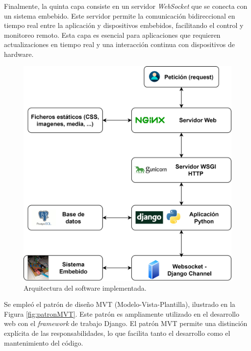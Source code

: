 Finalmente, la quinta capa consiste en un servidor \textit{WebSocket} que se conecta con un sistema embebido. Este servidor permite la comunicación bidireccional en tiempo real entre la aplicación y dispositivos embebidos, facilitando el control y monitoreo remoto. Esta capa es esencial para aplicaciones que requieren actualizaciones en tiempo real y una interacción continua con dispositivos de hardware.

\begin{figure}[H]
    \centering
    \includegraphics[width=0.7\linewidth]{Figuras/AplicacionWeb/arquitecturaSoft.png}
    \caption{Arquitectura del software implementada.}
    \label{fig:arquitecturaSoft}
\end{figure}
Se empleó el patrón de diseño MVT (Modelo-Vista-Plantilla), ilustrado en la Figura \ref{fig:patronMVT}. Este patrón es ampliamente utilizado en el desarrollo web con el \textit{framework} de trabajo Django. El patrón MVT permite una distinción explícita de las responsabilidades, lo que facilita tanto el desarrollo como el mantenimiento del código.


